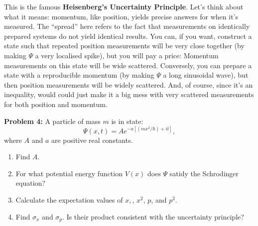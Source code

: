 \documentclass{article}
\begin{document}
This is the famous \textbf{Heisenberg's Uncertainty Principle}. Let's think about what it means: momentum, like position, yields precise answers for when it's measured. The ``spread'' here refers to the fact that measurements on identically prepared systems do not yield identical results. You can, if you want, construct a state such that repeated position measurements will be very close together (by making $\Psi$ a very localised spike), but you will pay a price: Momentum measurements on this state will be wide scattered. Conversely, you can prepare a state with a reproducible momentum (by making $\Psi$ a long sinusoidal wave), but then position measurements will be widely scattered. And, of course, since it's an inequality, would could just make it a big mess with very scattered measurements for both position and momentum.

\noindent\makebox[\linewidth]{\rule{\textwidth}{0.4pt}}
\textbf{Problem 4:} A particle of mass $m$ is in state:
$$ \Psi(x,t) = Ae^{-a[(mx^{2}/\hbar)+it]},$$
where $A$ and $a$ are positive real constants.
\begin{enumerate}[label=(\alph*), labelindent=\parindent,leftmargin=*]
\item Find $A$.
\item For what potential energy function $V(x)$ does $\Psi$ satidy the Schrodinger equation?
\item Calculate the expectation values of $x,$, $x^{2}$, $p$, and $p^{2}$.
\item Find $\sigma_{x}$ and $\sigma_{p}$. Is their product consistent with the uncertainty principle?
\end{enumerate}
\newpage
\end{document}
